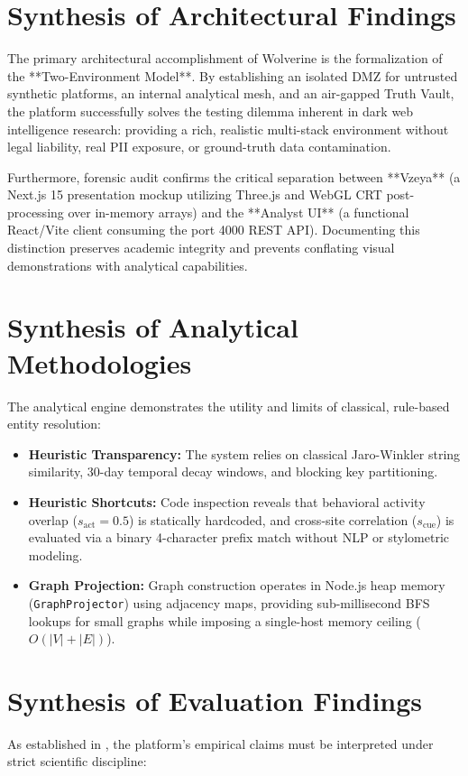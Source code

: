 \section{Synthesis of Architectural Findings}
\label{sec:disc-architecture}
The primary architectural accomplishment of Wolverine is the formalization of the **Two-Environment Model**. By establishing an isolated DMZ for untrusted synthetic platforms, an internal analytical mesh, and an air-gapped Truth Vault, the platform successfully solves the testing dilemma inherent in dark web intelligence research: providing a rich, realistic multi-stack environment without legal liability, real PII exposure, or ground-truth data contamination.

Furthermore, forensic audit confirms the critical separation between **Vzeya** (a Next.js 15 presentation mockup utilizing Three.js and WebGL CRT post-processing over in-memory arrays) and the **Analyst UI** (a functional React/Vite client consuming the port 4000 REST API). Documenting this distinction preserves academic integrity and prevents conflating visual demonstrations with analytical capabilities.

\section{Synthesis of Analytical Methodologies}
\label{sec:disc-analytics}
The analytical engine demonstrates the utility and limits of classical, rule-based entity resolution:
\begin{itemize}
    \item \textbf{Heuristic Transparency:} The system relies on classical Jaro-Winkler string similarity, 30-day temporal decay windows, and blocking key partitioning.
    \item \textbf{Heuristic Shortcuts:} Code inspection reveals that behavioral activity overlap ($s_{\text{act}} = 0.5$) is statically hardcoded, and cross-site correlation ($s_{\text{cue}}$) is evaluated via a binary 4-character prefix match without NLP or stylometric modeling.
    \item \textbf{Graph Projection:} Graph construction operates in Node.js heap memory (\texttt{GraphProjector}) using adjacency maps, providing sub-millisecond BFS lookups for small graphs while imposing a single-host memory ceiling ($O(|V| + |E|)$).
\end{itemize}

\section{Synthesis of Evaluation Findings}
\label{sec:disc-evaluation}
As established in , the platform's empirical claims must be interpreted under strict scientific discipline:

